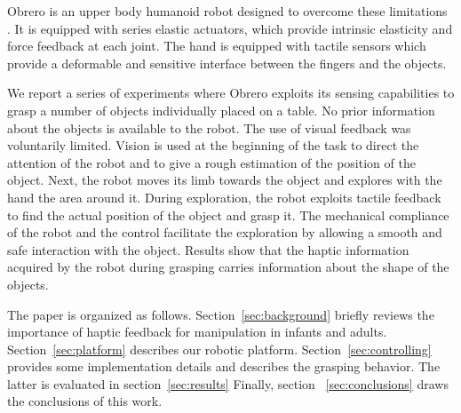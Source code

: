Obrero is an upper body humanoid robot designed to
overcome these limitations \cite{obrero}. It is equipped with series elastic
actuators, which provide intrinsic elasticity and force feedback
at each joint. The hand is equipped with tactile sensors
\cite{etorresjSoft} which provide a deformable and sensitive
interface between the fingers and the objects.

We report a series of experiments where Obrero exploits its
sensing capabilities to grasp a number of objects individually
placed on a table. No prior information about the objects is
available to the robot. The use of visual feedback was voluntarily
limited. Vision is used at the beginning of the task to direct the
attention of the robot and to give a rough estimation of the
position of the object. Next, the robot moves its limb towards the
object and explores with the hand the area around it. During
exploration, the robot exploits tactile feedback to find the
actual position of the object and grasp it. The mechanical
compliance of the robot and the control facilitate the exploration
by allowing a smooth and safe interaction with the object. Results
show that the haptic information acquired by the robot during
grasping carries information about the shape of the objects.

The paper is organized as follows. Section~\ref{sec:background}
briefly reviews the importance of haptic feedback for manipulation
in infants and adults. Section~\ref{sec:platform} describes our
robotic platform. Section~\ref{sec:controlling} provides some
implementation details and describes the grasping behavior. The
latter is evaluated in section~\ref{sec:results} Finally, section
~\ref{sec:conclusions} draws the conclusions of this work.

